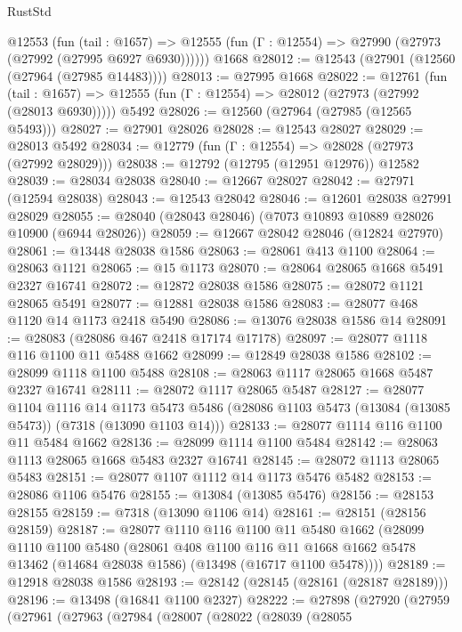 \begin{lexlean}{RustStd}
\begin{coremodule}
    @12553
      (fun (tail : @1657) =>
      @12555 (fun (Γ : @12554) => @27990 (@27973 (@27992 (@27995 @6927 @6930))))))
    @1668
@28012 := @12543 (@27901 (@12560 (@27964 (@27985 @14483))))
@28013 := @27995 @1668
@28022 := @12761
    (fun (tail : @1657) => @12555 (fun (Γ : @12554) => @28012 (@27973 (@27992 (@28013 @6930)))))
    @5492
@28026 := @12560 (@27964 (@27985 (@12565 @5493)))
@28027 := @27901 @28026
@28028 := @12543 @28027
@28029 := @28013 @5492
@28034 := @12779 (fun (Γ : @12554) => @28028 (@27973 (@27992 @28029)))
@28038 := @12792 (@12795 (@12951 @12976)) @12582
@28039 := @28034 @28038
@28040 := @12667 @28027
@28042 := @27971 (@12594 @28038)
@28043 := @12543 @28042
@28046 := @12601 @28038 @27991 @28029
@28055 := @28040 (@28043 @28046) (@7073 @10893 @10889 @28026 @10900 (@6944 @28026))
@28059 := @12667 @28042 @28046 (@12824 @27970)
@28061 := @13448 @28038 @1586
@28063 := @28061 @413 @1100
@28064 := @28063 @1121
@28065 := @15 @1173
@28070 := @28064 @28065 @1668 @5491 @2327 @16741
@28072 := @12872 @28038 @1586
@28075 := @28072 @1121 @28065 @5491
@28077 := @12881 @28038 @1586
@28083 := @28077 @468 @1120 @14 @1173 @2418 @5490
@28086 := @13076 @28038 @1586 @14
@28091 := @28083 (@28086 @467 @2418 @17174 @17178)
@28097 := @28077 @1118 @116 @1100 @11 @5488 @1662
@28099 := @12849 @28038 @1586
@28102 := @28099 @1118 @1100 @5488
@28108 := @28063 @1117 @28065 @1668 @5487 @2327 @16741
@28111 := @28072 @1117 @28065 @5487
@28127 := @28077
    @1104
    @1116
    @14
    @1173
    @5473
    @5486
    (@28086 @1103 @5473 (@13084 (@13085 @5473)) (@7318 (@13090 @1103 @14)))
@28133 := @28077 @1114 @116 @1100 @11 @5484 @1662
@28136 := @28099 @1114 @1100 @5484
@28142 := @28063 @1113 @28065 @1668 @5483 @2327 @16741
@28145 := @28072 @1113 @28065 @5483
@28151 := @28077 @1107 @1112 @14 @1173 @5476 @5482
@28153 := @28086 @1106 @5476
@28155 := @13084 (@13085 @5476)
@28156 := @28153 @28155
@28159 := @7318 (@13090 @1106 @14)
@28161 := @28151 (@28156 @28159)
@28187 := @28077
    @1110
    @116
    @1100
    @11
    @5480
    @1662
    (@28099
      @1110
      @1100
      @5480
      (@28061
        @408
        @1100
        @116
        @11
        @1668
        @1662
        @5478
        @13462
        (@14684 @28038 @1586)
        (@13498 (@16717 @1100 @5478))))
@28189 := @12918 @28038 @1586
@28193 := @28142 (@28145 (@28161 (@28187 @28189)))
@28196 := @13498 (@16841 @1100 @2327)
@28222 := @27898
    (@27920
      (@27959
        (@27961
          (@27963
            (@27984
              (@28007
                (@28022
                  (@28039
                    (@28055

\end{coremodule}
\end{lexlean}
